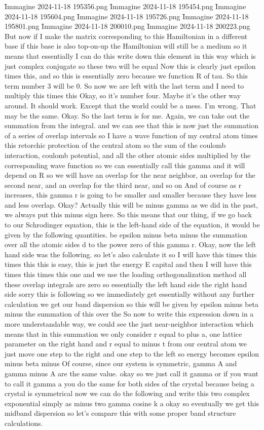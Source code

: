 \f{Immagine 2024-11-18 195356.png}
\f{Immagine 2024-11-18 195454.png}
\f{Immagine 2024-11-18 195604.png}
\f{Immagine 2024-11-18 195726.png}
\f{Immagine 2024-11-18 195801.png}
\f{Immagine 2024-11-18 200010.png}
\f{Immagine 2024-11-18 200223.png}
But now if I make the matrix corresponding to this Hamiltonian in a different base if this base is also top-on-up the Hamiltonian will still be a medium so it means that essentially I can do this write down this element in this way which is just complex conjugate so these two will be equal Now this is clearly just epsilon times this, and so this is essentially zero because we function R of tau. So this term number 3 will be 0. So now we are left with the last term and I need to multiply this times this Okay, so it's number four. Maybe it's the other way around. It should work. Except that the world could be a mess. I'm wrong. That may be the same. Okay. So the last term is for me. Again, we can take out the summation from the integral. and we can see that this is now just the summation of a series of overlap intervals so I have a wave function of my central atom times this retorchic protection of the central atom so the sum of the coulomb interaction, coulomb potential, and all the other atomic sides multiplied by the corresponding wave function so we can essentially call this gamma and it will depend on R so we will have an overlap for the near neighbor, an overlap for the second near, and an overlap for the third near, and so on And of course as r increases, this gamma r is going to be smaller and smaller because they have less and less overlap. Okay? Actually this will be minus gamma as we did in the past, we always put this minus sign here. So this means that our thing, if we go back to our Schrodinger equation, this is the left-hand side of the equation, it would be given by the following quantities. be epsilon minus beta minus the summation over all the atomic sides d to the power zero of this gamma r. Okay, now the left hand side was the following. so let's also calculate it so I will have this times this times this this is easy, this is just the energy E capital and then I will have this times this times this one and we use the loading orthogonalization method all these overlap integrals are zero so essentially the left hand side the right hand side sorry this is following so we immediately get essentially without any further calculation we get our band dispersion so this will be given by epsilon minus beta minus the summation of this over the So now to write this expression down in a more understandable way, we could see the just near-neighbor interaction which means that in this summation we only consider r equal to plus a, one lattice parameter on the right hand and r equal to minus t from our central atom we just move one step to the right and one step to the left so energy becomes epsilon minus beta minus Of course, since our system is symmetric, gamma A and gamma minus A are the same value. okay so we just call it gamma or if you want to call it gamma a you do the same for both sides of the crystal because being a crystal is symmetrical now we can do the following and write this two complex exponential simply as minus two gamma cosine k a okay so eventually we get this midband dispersion so let's compare this with some proper band structure calculations.
